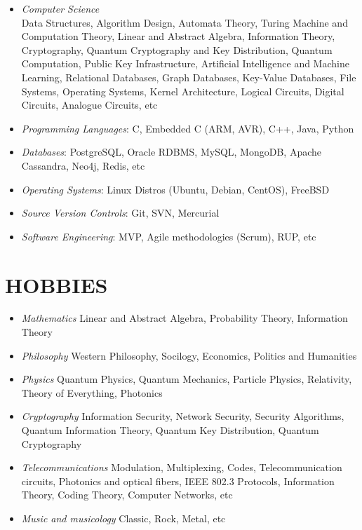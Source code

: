 \documentclass[10pt,a4paper]{article}
\begin{document}
\begin{itemize}
  \setlength{\rightskip}{2cm}
  \setlength\itemsep{0em}
  \item \small \textit {Computer Science} \\
  Data Structures, Algorithm Design, Automata Theory, Turing Machine and Computation Theory, Linear and Abstract Algebra, Information Theory, Cryptography, Quantum Cryptography and Key Distribution, Quantum Computation, Public Key Infrastructure, Artificial Intelligence and Machine Learning,  Relational Databases, Graph Databases, Key-Value Databases, File Systems, Operating Systems, Kernel Architecture, Logical Circuits, Digital Circuits, Analogue Circuits, etc
  \item \small \textit {Programming Languages}:
  C, Embedded C (ARM, AVR), C++, Java, Python
  \item \small \textit {Databases}:
  PostgreSQL, Oracle RDBMS, MySQL, MongoDB, Apache Cassandra, Neo4j, Redis, etc
  \item \small \textit {Operating Systems}:
  Linux Distros (Ubuntu, Debian, CentOS), FreeBSD
  \item \small \textit {Source Version Controls}:
  Git, SVN, Mercurial
  \item \small \textit {Software Engineering}:
  MVP, Agile methodologies (Scrum), RUP, etc
\end{itemize}


\section{HOBBIES}
  \begin{itemize}
    \setlength{\rightskip}{2cm}
    \setlength\itemsep{0em}
    \item \small \textit{Mathematics} Linear and Abstract Algebra, Probability Theory, Information Theory
	  \item \small \textit{Philosophy} Western Philosophy, Socilogy, Economics, Politics and Humanities
	  \item \small \textit{Physics} Quantum Physics, Quantum Mechanics, Particle Physics, Relativity, Theory of Everything, Photonics 
	  \item \small \textit{Cryptography} Information Security, Network Security, Security Algorithms, Quantum Information Theory, Quantum Key Distribution, Quantum Cryptography 
	  \item \small \textit{Telecommunications} Modulation, Multiplexing, Codes, Telecommunication circuits, Photonics and optical fibers, IEEE 802.3 Protocols, Information Theory, Coding Theory, Computer Networks, etc 
    \item \small \textit{Music and musicology} Classic, Rock, Metal, etc
  \end{itemize}
\end{document}
